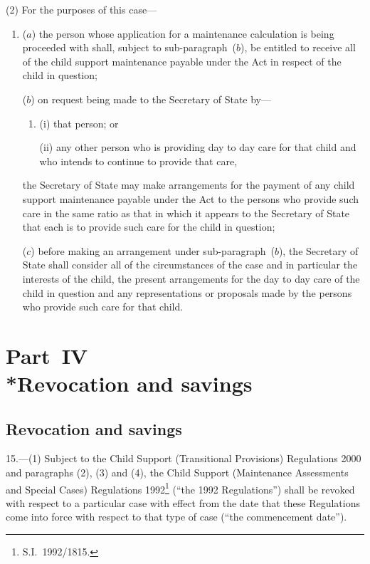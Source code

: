 \documentclass[12pt,a4paper]{article}
\begin{document}
(2) For the purposes of this case—
\begin{enumerate}\item[]
($a$) the person whose application for a maintenance calculation is being proceeded with shall, subject to sub-paragraph~($b$), be entitled to receive all of the child support maintenance payable under the Act in respect of the child in question;

($b$) on request being made to the Secretary of State by—
\begin{enumerate}\item[]
(i) that person; or

(ii) any other person who is providing day to day care for that child and who intends to continue to provide that care,
\end{enumerate}
the Secretary of State may make arrangements for the payment of any child support maintenance payable under the Act to the persons who provide such care in the same ratio as that in which it appears to the Secretary of State that each is to provide such care for the child in question;

($c$) before making an arrangement under sub-paragraph~($b$), the Secretary of State shall consider all of the circumstances of the case and in particular the interests of the child, the present arrangements for the day to day care of the child in question and any representations or proposals made by the persons who provide such care for that child.
\end{enumerate}

\section[Part~IV --- Revocation and savings]{Part~IV\\*Revocation and savings}

\renewcommand\parthead{--- Part~IV}

\subsection[15. Revocation and savings]{Revocation and savings}

15.---(1)  Subject to 
the Child Support (Transitional Provisions) Regulations 2000 and %
paragraphs (2), (3) and (4), the Child Support (Maintenance Assessments and Special Cases) Regulations 1992\footnote{S.I.~1992/1815.} (“the 1992 Regulations”) shall be revoked with respect to a particular case with effect from the date that these Regulations come into force with respect to that type of case (“the commencement date”).
\end{document}
